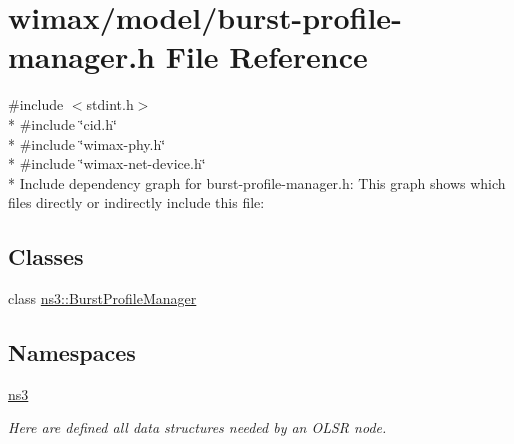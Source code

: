 \hypertarget{burst-profile-manager_8h}{}\section{wimax/model/burst-\/profile-\/manager.h File Reference}
\label{burst-profile-manager_8h}
{\ttfamily \#include $<$stdint.\+h$>$}\\*
{\ttfamily \#include \char`\"{}cid.\+h\char`\"{}}\\*
{\ttfamily \#include \char`\"{}wimax-\/phy.\+h\char`\"{}}\\*
{\ttfamily \#include \char`\"{}wimax-\/net-\/device.\+h\char`\"{}}\\*
Include dependency graph for burst-\/profile-\/manager.h\+:
This graph shows which files directly or indirectly include this file\+:
\subsection*{Classes}
\begin{DoxyCompactItemize}
\item 
class \hyperlink{classns3_1_1BurstProfileManager}{ns3\+::\+Burst\+Profile\+Manager}
\end{DoxyCompactItemize}
\subsection*{Namespaces}
\begin{DoxyCompactItemize}
\item 
 \hyperlink{namespacens3}{ns3}
\begin{DoxyCompactList}\small\item\em Here are defined all data structures needed by an O\+L\+SR node. \end{DoxyCompactList}\end{DoxyCompactItemize}

